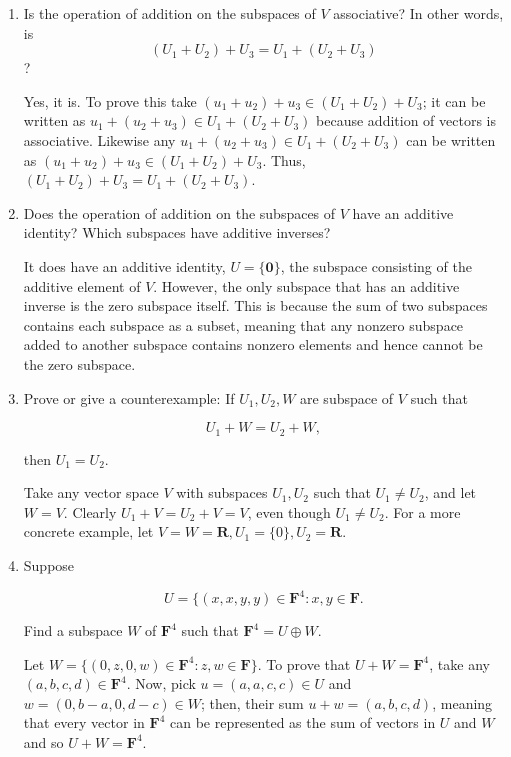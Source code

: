 \documentclass{book}
\begin{document}
\begin{enumerate}
\item Is the operation of addition on the subspaces of \(V\) associative? In other words, is \[(U_1+U_2)+U_3=U_1+(U_2+U_3)\]?

Yes, it is.  To prove this take \((u_1+u_2)+u_3 \in (U_1+U_2)+U_3\); it can be written as \(u_1+(u_2+u_3) \in U_1+(U_2+U_3)\) because addition of vectors is associative.  Likewise any \(u_1+(u_2+u_3) \in U_1+(U_2+U_3)\) can be written as \((u_1+u_2)+u_3 \in (U_1+U_2)+U_3\).  Thus, \((U_1+U_2)+U_3=U_1+(U_2+U_3)\).

\item Does the operation of addition on the subspaces of \(V\) have an additive identity? Which subspaces have additive inverses?

It does have an additive identity, \(U=\{\textbf{0}\}\), the subspace consisting of the additive element of \(V\).  However, the only subspace that has an additive inverse is the zero subspace itself.  This is because the sum of two subspaces contains each subspace as a subset, meaning that any nonzero subspace added to another subspace contains nonzero elements and hence cannot be the zero subspace.

\item Prove or give a counterexample: If \(U_1,U_2,W\) are subspace of \(V\) such that 

\begin{equation*}
    U_1+W=U_2+W,
\end{equation*}

then \(U_1=U_2\).

Take any vector space \(V\) with subspaces \(U_1,U_2\) such that \(U_1 \neq U_2\), and let \(W=V\).  Clearly \(U_1+V=U_2+V=V\), even though \(U_1 \neq U_2\).  For a more concrete example, let \(V=W=\textbf{R}, U_1=\{0\},U_2=\textbf{R}\).

\item Suppose 

\begin{equation*}
    U=\{(x,x,y,y) \in \textbf{F}^4: x,y \in \textbf{F}.
\end{equation*}

Find a subspace \(W\) of \(\textbf{F}^4\) such that \(\textbf{F}^4= U \oplus W\).

Let \(W=\{(0,z,0,w) \in \textbf{F}^4: z,w \in \textbf{F}\}\).  To prove that \(U+W=\textbf{F}^4\), take any \((a,b,c,d) \in \textbf{F}^4\).  Now, pick \(u=(a,a,c,c) \in U\) and \(w=(0,b-a,0,d-c) \in W\); then, their sum \(u+w=(a,b,c,d)\), meaning that every vector in \(\textbf{F}^4\) can be represented as the sum of vectors in \(U\) and \(W\) and so \(U+W=\textbf{F}^4\).


\end{enumerate}
\end{document}
